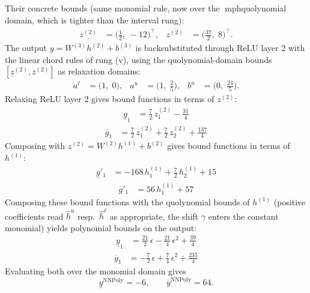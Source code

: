 \documentclass[11pt]{article}
\begin{document}
Their concrete bounds (same monomial rule, now over the mph{quolynomial} domain, which is tighter than the interval rung):
\begin{align*}
\underline{z^{(2)}} &= \bigl(\frac{1}{2},\; -12\bigr)^{\!\top}, & \overline{z^{(2)}} &= \bigl(\frac{37}{2},\; 8\bigr)^{\!\top}.
\end{align*}
The output $y = W^{(3)} h^{(2)} + b^{(3)}$ is backsubstituted through ReLU layer 2 with the linear chord rules of rung (v), using the quolynomial-domain bounds
$[\underline{z}^{(2)}, \overline{z}^{(2)}]$ as relaxation domains:
\begin{align*}
a^{\ell} &= \bigl(1,\; 0\bigr), & a^{u} &= \bigl(1,\; \frac{2}{5}\bigr), & b^{u} &= \bigl(0,\; \frac{24}{5}\bigr).
\end{align*}
Relaxing ReLU layer 2 gives bound functions in terms of $z^{(2)}$:
\begin{align*}
\underline{g}_{1} &= \frac{7}{2}\,z^{(2)}_{1} - \frac{31}{4}
\end{align*}
\begin{align*}
\overline{g}_{1} &= \frac{7}{2}\,z^{(2)}_{1} + \frac{7}{2}\,z^{(2)}_{2} + \frac{137}{4}
\end{align*}
Composing with $z^{(2)} = W^{(2)} h^{(1)} + b^{(2)}$ gives bound functions in terms of $h^{(1)}$:
\begin{align*}
\underline{g}'_{1} &= -168\,h^{(1)}_{1} + \frac{7}{2}\,h^{(1)}_{2} + 15
\end{align*}
\begin{align*}
\overline{g}'_{1} &= 56\,h^{(1)}_{1} + 57
\end{align*}
Composing these bound functions with the quolynomial bounds of $h^{(1)}$ (positive
coefficients read $\hat{h}^{u}$ resp.\ $\hat{h}^{\ell}$ as appropriate, the shift $\gamma$ enters the
constant monomial) yields polynomial bounds on the output:
\begin{align*}
\underline{y}_{1} &= \frac{21}{2}\,\epsilon - \frac{21}{4}\,\epsilon^2 + \frac{39}{4}
\end{align*}
\begin{align*}
\overline{y}_{1} &= -\frac{7}{2}\,\epsilon + \frac{7}{4}\,\epsilon^2 + \frac{235}{4}
\end{align*}
Evaluating both over the monomial domain gives
\begin{equation*}
\underline{y}^{\text{NNPoly}} = -6, \qquad \overline{y}^{\text{NNPoly}} = 64.
\end{equation*}
\end{document}
